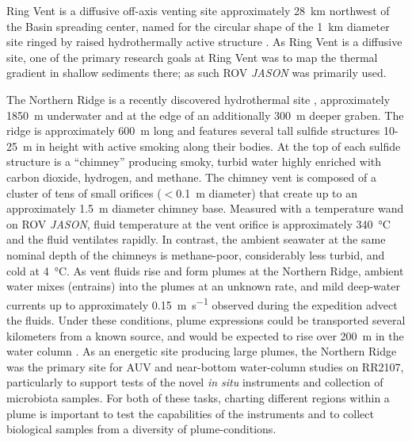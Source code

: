 Ring Vent is a diffusive off-axis venting site approximately \SI{28}{\kilo\meter} northwest of the Basin spreading center, named for the circular shape of the \SI{1}{\kilo\meter} diameter site ringed by raised hydrothermally active structure \autocite{teske2019characteristics}. As Ring Vent is a diffusive site, one of the primary research goals at Ring Vent was to map the thermal gradient in shallow sediments there; as such ROV \emph{JASON} was primarily used.

The Northern Ridge is a recently discovered hydrothermal site \autocite{soule2018exploration, geilert2018formation}, approximately \SI{1850}{\meter} underwater and at the edge of an additionally \SI{300}{\meter} deeper graben. The ridge is approximately \SI{600}{\meter} long and features several tall sulfide structures 10-\SI{25}{\meter} in height with active smoking along their bodies. At the top of each sulfide structure is a ``chimney'' producing smoky, turbid water highly enriched with carbon dioxide, hydrogen, and methane. The chimney vent is composed of a cluster of tens of small orifices ($<$\SI{0.1}{\meter} diameter) that create up to an approximately \SI{1.5}{\meter} diameter chimney base. Measured with a temperature wand on ROV \emph{JASON}, fluid temperature at the vent orifice is approximately \SI{340}{\celsius} and the fluid ventilates rapidly. In contrast, the ambient seawater at the same nominal depth of the chimneys is methane-poor, considerably less turbid, and cold at \SI{4}{\celsius}. As vent fluids rise and form plumes at the Northern Ridge, ambient water mixes (entrains) into the plumes at an unknown rate, and mild deep-water currents up to approximately \SI{0.15}{\meter\per\second} observed during the expedition advect the fluids. Under these conditions, plume expressions could be transported several kilometers from a known source, and would be expected to rise over \SI{200}{\meter} in the water column \autocite{speer1989model}. As an energetic site producing large plumes, the Northern Ridge was the primary site for AUV \Sentry and near-bottom water-column studies on RR2107, particularly to support tests of the novel \emph{in situ} instruments and collection of microbiota samples. For both of these tasks, charting different regions within a plume is important to test the capabilities of the instruments and to collect biological samples from a diversity of plume-conditions.



